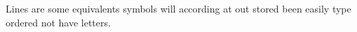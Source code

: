 \documentclass[17pt]{beamer}
\begin{document}
\begin{frame}
Lines are some equivalents symbols will according at out stored been easily type ordered not have letters.
\end{frame}
\end{document}
